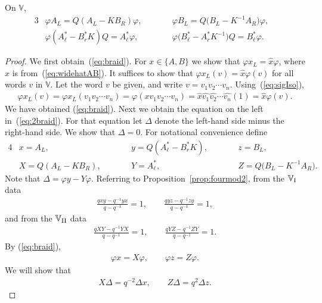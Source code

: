 \begin{Lemma}\label{lem:braid}On $\mathbb V$,
\begin{alignat}{3}
&\varphi A_L = Q(A_L-K B_R) \varphi, \qquad && \varphi B_L = Q\big(B_L-K^{-1} A_R\big) \varphi,& \label{eq:braid}\\
& \varphi (A^*_\ell-B^*_r K)Q = A^*_\ell \varphi, \qquad&& \varphi \big(B^*_\ell-A^*_r K^{-1}\big)Q = B^*_\ell \varphi.& \label{eq:2braid}
\end{alignat}
\end{Lemma}
\begin{proof} We first obtain~(\ref{eq:braid}). For $x \in \lbrace A, B\rbrace$ we show that $\varphi x_L = \widehat x \varphi$, where $\widehat x$ is from~(\ref{eq:widehatAB}). It suffices to show that $\varphi x_L (v) = \widehat x \varphi (v)$ for all words $v$ in $\mathbb V$. Let the word $v$ be given, and write $v=v_1v_2\cdots v_n$. Using~(\ref{eq:sigIso}),
\begin{gather*}
\varphi x_L (v) =\varphi x_L (v_1v_2\cdots v_n)=\varphi (x v_1v_2\cdots v_n)
= \widehat x \widehat{v_1} \widehat{v_2}\cdots \widehat{v_n}(1)= \widehat x \varphi (v).
\end{gather*}
We have obtained (\ref{eq:braid}). Next we obtain the equation on the left in~(\ref{eq:2braid}).
For that equation let $\Delta$ denote the left-hand side minus the right-hand side. We show that $\Delta=0$.
For notational convenience define
\begin{alignat*}{4}
&x = A_L, \qquad && y= Q(A^*_{\ell}-B^*_r K), \qquad && z= B_L,& \\
&X= Q(A_L-KB_R), \qquad && Y=A^*_\ell, \qquad && Z= Q\big(B_L-K^{-1} A_R\big).
\end{alignat*}
Note that $\Delta = \varphi y - Y \varphi$. Referring to Proposition~\ref{prop:fourmod2}, from the $\mathbb V_{\rm I}$ data
\begin{gather*}
\frac{qxy-q^{-1}yx}{q-q^{-1}}=1, \qquad \frac{qyz-q^{-1}zy}{q-q^{-1}}=1,
\end{gather*}
and from the $\mathbb V_{\rm II}$ data
\begin{gather*}
\frac{qXY-q^{-1}YX}{q-q^{-1}}=1, \qquad \frac{qYZ-q^{-1}ZY}{q-q^{-1}}=1.
\end{gather*}
By (\ref{eq:braid}),
\begin{gather*}
\varphi x = X \varphi, \qquad \varphi z = Z \varphi.
\end{gather*}
We will show that
\begin{gather}
X\Delta = q^{-2} \Delta x, \qquad Z\Delta = q^2 \Delta z.

\end{gather}
\end{proof}
